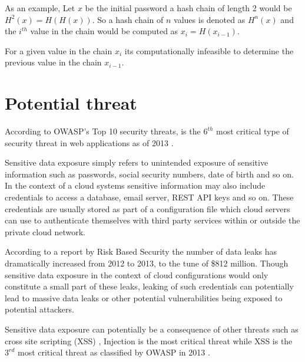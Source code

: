\documentclass[12pt,conference]{IEEEtran}
\begin{document}

As an example, Let $x$ be the initial password a hash chain of length 2 would be $H^{2}(x) = H(H(x))$. So a hash chain of $n$ values is denoted as $H^{n}(x)$ and the $i^{th}$ value in the chain would be computed as $x_{i} = H(x_{i-1})$.

For a given value in the chain $x_{i}$ its computationally infeasible to determine the previous value in the chain $x_{i-1}$.

\section*{Potential threat}

According to OWASP's Top 10 security threats,  is the $6^{th}$ most critical type of security threat in web applications as of 2013 \cite{wichers_owasp_2014}. 

Sensitive data exposure simply refers to unintended exposure of sensitive information such as passwords, social security numbers, date of birth and so on. In the context of a cloud systems sensitive information may also include credentials to access a database, email server, REST API keys and so on. These credentials are usually stored as part of a configuration file which cloud servers can use to authenticate themselves with third party services within or outside the private cloud network. 

According to a report by Risk Based Security \cite{risk_based_executives_2014} \cite{shu_privacy-preserving_2015} the number of data leaks has dramatically increased from 2012 to 2013, to the tune of \$812 million. Though sensitive data exposure in the context of cloud configurations would only constitute a small part of these leaks, leaking of such credentials can potentially lead to massive data leaks or other potential vulnerabilities being exposed to potential attackers.

Sensitive data exposure can potentially be a consequence of other threats such as cross site scripting (XSS) \cite{louw_blueprint:_2009}, Injection is the most critical threat while XSS is the $3^{rd}$ most critical threat as classified by OWASP in 2013 \cite{wichers_owasp_2014}. 
\end{document}
